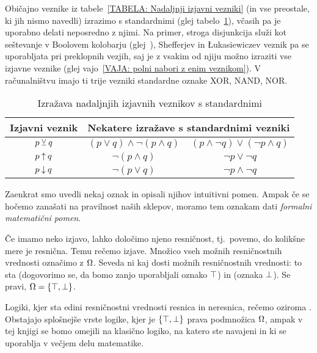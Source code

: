 		Običajno veznike iz tabele~\ref{TABELA: Nadaljnji izjavni vezniki} (in vse preostale, ki jih nismo navedli) izrazimo s standardnimi (glej tabelo~\ref{TABELA: Izražava nadaljnjih izjavnih veznikov s standardnimi}), včasih pa je uporabno delati neposredno z njimi. Na primer, stroga disjunkcija služi kot seštevanje v Boolovem kolobarju (glej~), Shefferjev in Łukasiewiczev veznik pa se uporabljata pri preklopnih vezjih, saj je z vsakim od njiju možno izraziti vse izjavne veznike (glej vajo~\ref{VAJA: polni nabori z enim veznikom}). V računalništvu imajo ti trije vezniki standardne oznake XOR, NAND, NOR.
		
		\begin{table}[!ht]
			\centering
			\begin{tabular}{|ccc|}
				\hline
				\textbf{Izjavni veznik} & \multicolumn{2}{c|}{\textbf{Nekatere izražave s standardnimi vezniki}} \\
				\hline
				$p \mathbin{\veebar} q$ & $(p \lor q) \land \lnot(p \land q)$ & $(p \land \lnot{q}) \lor (\lnot{p} \land q)$ \\
				$p \mathbin{\uparrow} q$ & $\lnot(p \land q)$ & $\lnot{p} \lor \lnot{q}$ \\
				$p \mathbin{\downarrow} q$ & $\lnot(p \lor q)$ & $\lnot{p} \land \lnot{q}$ \\
				\hline
			\end{tabular}
			\caption{Izražava nadaljnjih izjavnih veznikov s standardnimi}\label{TABELA: Izražava nadaljnjih izjavnih veznikov s standardnimi}
		\end{table}
		
		
		Zaenkrat smo uvedli nekaj oznak in opisali njihov intuitivni pomen. Ampak če se hočemo zanašati na pravilnost naših sklepov, moramo tem oznakam dati \emph{formalni matematični pomen}.
		
		Če imamo neko izjavo, lahko določimo njeno resničnost, tj.~povemo, do kolikšne mere je resnična. Temu rečemo  izjave. Množico vseh možnih resničnostnih vrednosti označimo z $\Omega$. Seveda ni kaj dosti možnih resničnostnih vrednosti: to sta  (dogovorimo se, da bomo zanjo uporabljali oznako $\top$) in  (oznaka $\bot$). Se pravi, $\tvs = \set{\true, \false}$.
		
		\begin{opomba}
			Logiki, kjer sta edini resničnostni vrednosti resnica in neresnica, rečemo  oziroma . Obstajajo splošnejše vrste logike, kjer je $\set{\true, \false}$ prava podmnožica $\Omega$, ampak v tej knjigi se bomo omejili na klasično logiko, na katero ste navajeni in ki se uporablja v večjem delu matematike.
		\end{opomba}
		
